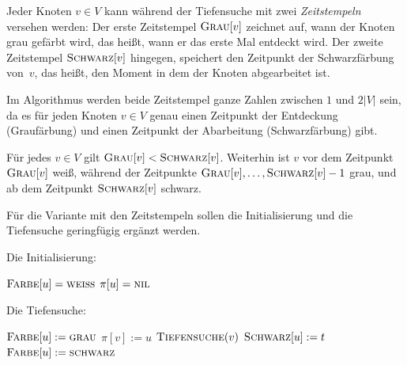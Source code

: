 \begin{bem} 
 Jeder Knoten $v \in V$ kann während der Tiefensuche mit zwei \emph{Zeitstempeln} versehen werden: Der erste Zeitstempel $\mathop{\text{\textsc{Grau}}}[v]$ zeichnet auf, wann der Knoten grau gefärbt wird, das heißt, wann er das erste Mal entdeckt wird.
Der zweite Zeitstempel $\mathop{\text{\textsc{Schwarz}}}[v]$ hingegen, speichert den Zeitpunkt der Schwarzfärbung von~$v$, das heißt, den Moment in dem der Knoten abgearbeitet ist.

Im Algorithmus werden beide Zeitstempel ganze Zahlen zwischen $1$ und $2 |V|$ sein, da es für jeden Knoten $v \in V$ genau einen Zeitpunkt der Entdeckung (Graufärbung) und einen Zeitpunkt der Abarbeitung (Schwarzfärbung) gibt.

Für jedes $v \in V$ gilt $\mathop{\text{\textsc{Grau}}}[v] < \mathop{\text{\textsc{Schwarz}}}[v]$.
Weiterhin ist $v$ vor dem Zeitpunkt $\mathop{\text{\textsc{Grau}}}[v]$ weiß, während der Zeitpunkte $\mathop{\text{\textsc{Grau}}}[v],\ldots,\mathop{\text{\textsc{Schwarz}}}[v]-1$ grau, und ab dem Zeitpunkt $\mathop{\text{\textsc{Schwarz}}}[v]$ schwarz.

Für die Variante mit den Zeitstempeln sollen die Initialisierung und die Tiefensuche geringfügig ergänzt werden. 

Die Initialisierung: 

	\begin{algorithm} 
	\caption{$\cc{Tiefensuche-Initialisieren}(D)$}
	\begin{algorithmic}[1]
		\STATE $\mathop{\text{\textsc{Farbe}}}[u]=\mathop{\text{\textsc{weiß}}}$
		\STATE $\pi[u]=\mathop{\text{\textsc{nil}}}$
		\ENDFOR
	\end{algorithmic}
\end{algorithm} 

Die Tiefensuche: 

\begin{algorithm}[H]
	\caption{$\cc{Tiefensuche}(u)$}
	\begin{algorithmic}[1]
		\STATE $\mathop{\text{\textsc{Farbe}}}[u]:=\mathop{\text{\textsc{grau}}}$
		 \STATE $\pi[v]:=u$  
		\STATE $\mathop{\text{\textsc{Tiefensuche}}}(v)$
		\ENDIF
		\ENDFOR
		\STATE\label{line:schwarzfaerbung-in-tiefensuche} {\color{red} $\mathop{\text{\textsc{Schwarz}}}[u] := t$ $\quad$ }
		\STATE $\mathop{\text{\textsc{Farbe}}}[u]:=\mathop{\text{\textsc{schwarz}}}$
	\end{algorithmic}
\end{algorithm}
\end{bem}

